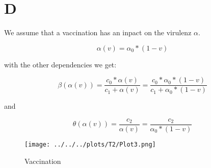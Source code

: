\documentclass{article}
\begin{document}
\section*{D}

We assume that a vaccination has an inpact on the virulenz $\alpha$.

\begin{equation}
    \alpha(v) = \alpha_0 * (1-v)
\end{equation}

with the other dependencies we get:

\begin{equation}
    \beta(\alpha(v)) = \frac{c_0 * \alpha(v)}{c_1 + \alpha(v)} = \frac{c_0 * \alpha_0 * (1-v)}{c_1 + \alpha_0 * (1-v)}
\end{equation}

and 

\begin{equation}
    \theta(\alpha(v)) = \frac{c_2}{\alpha(v)} =\frac{c_2}{\alpha_0 * (1-v)}
\end{equation}

\begin{figure}[H]
    \centering
    \texttt{[image: ../../../plots/T2/Plot3.png]}
    \caption{Vaccination}\label{fig:vac}
\end{figure}
\end{document}

